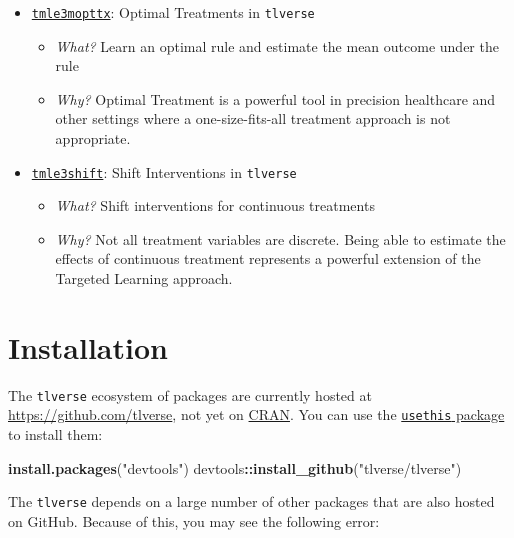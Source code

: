 \documentclass[12pt, krantz2,]{book}
\newenvironment{Shaded}{\begin{snugshade}}{\end{snugshade}}
\newcommand{\KeywordTok}[1]{\textcolor[rgb]{0.13,0.29,0.53}{\textbf{#1}}}
\newcommand{\NormalTok}[1]{#1}
\newcommand{\OperatorTok}[1]{\textcolor[rgb]{0.81,0.36,0.00}{\textbf{#1}}}
\newcommand{\StringTok}[1]{\textcolor[rgb]{0.31,0.60,0.02}{#1}}
\providecommand{\tightlist}{%
  \setlength{\itemsep}{0pt}\setlength{\parskip}{0pt}}
\theoremstyle{definition}
\theoremstyle{definition}
\theoremstyle{definition}
\newcommand{\1}{\mathbbm{1}}
\begin{document}
\begin{itemize}
\tightlist
\item
  \href{https://github.com/tlverse/tmle3mopttx}{\texttt{tmle3mopttx}}: Optimal Treatments
  in \texttt{tlverse}

  \begin{itemize}
  \tightlist
  \item
    \emph{What?} Learn an optimal rule and estimate the mean outcome under the rule
  \item
    \emph{Why?} Optimal Treatment is a powerful tool in precision healthcare and
    other settings where a one-size-fits-all treatment approach is not
    appropriate.
  \end{itemize}
\item
  \href{https://github.com/tlverse/tmle3shift}{\texttt{tmle3shift}}: Shift Interventions in
  \texttt{tlverse}

  \begin{itemize}
  \tightlist
  \item
    \emph{What?} Shift interventions for continuous treatments
  \item
    \emph{Why?} Not all treatment variables are discrete. Being able to estimate the
    effects of continuous treatment represents a powerful extension of the
    Targeted Learning approach.
  \end{itemize}
\end{itemize}

\hypertarget{installtlverse}{%
\section{Installation}\label{installtlverse}}

The \texttt{tlverse} ecosystem of packages are currently hosted at
\url{https://github.com/tlverse}, not yet on \href{https://CRAN.R-project.org/}{CRAN}. You
can use the \href{https://usethis.r-lib.org/}{\texttt{usethis} package} to install them:

\begin{Shaded}
\begin{Highlighting}[]
\KeywordTok{install.packages}\NormalTok{(}\StringTok{"devtools"}\NormalTok{)}
\NormalTok{devtools}\OperatorTok{::}\KeywordTok{install_github}\NormalTok{(}\StringTok{"tlverse/tlverse"}\NormalTok{)}
\end{Highlighting}
\end{Shaded}

The \texttt{tlverse} depends on a large number of other packages that are also hosted
on GitHub. Because of this, you may see the following error:
\end{document}
